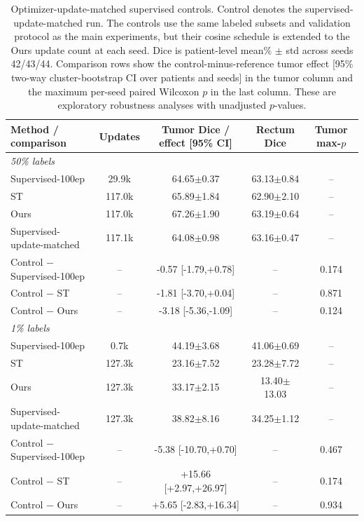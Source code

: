 \begin{table}[!htbp]
\centering
\caption{Optimizer-update-matched supervised controls. Control denotes the
supervised-update-matched run. The controls use the same labeled subsets and
validation protocol as the main experiments, but their cosine schedule is extended
to the Ours update count at each seed. Dice is patient-level mean\% $\pm$ std
across seeds 42/43/44. Comparison rows show the control-minus-reference tumor
effect [95\% two-way cluster-bootstrap CI over patients and seeds] in the tumor
column and the maximum per-seed paired Wilcoxon $p$ in the last column. These are
exploratory robustness analyses with unadjusted $p$-values.}
\label{tabS:update_matched}
\scriptsize
\setlength{\tabcolsep}{2.5pt}
\begin{tabular}{lcccc}
\toprule
Method / comparison & Updates & Tumor Dice / effect [95\% CI] & Rectum Dice & Tumor max-$p$ \\
\midrule
\multicolumn{5}{l}{\textit{50\% labels}} \\
Supervised-100ep & 29.9k & 64.65$\pm$0.37 & 63.13$\pm$0.84 & -- \\
ST & 117.0k & 65.89$\pm$1.84 & 62.90$\pm$2.10 & -- \\
Ours & 117.0k & 67.26$\pm$1.90 & 63.19$\pm$0.64 & -- \\
Supervised-update-matched & 117.1k & 64.08$\pm$0.98 & 63.16$\pm$0.47 & -- \\
\midrule
Control $-$ Supervised-100ep & -- & -0.57 [-1.79,+0.78] & -- & 0.174 \\
Control $-$ ST & -- & -1.81 [-3.70,+0.04] & -- & 0.871 \\
Control $-$ Ours & -- & -3.18 [-5.36,-1.09] & -- & 0.124 \\
\midrule
\multicolumn{5}{l}{\textit{1\% labels}} \\
Supervised-100ep & 0.7k & 44.19$\pm$3.68 & 41.06$\pm$0.69 & -- \\
ST & 127.3k & 23.16$\pm$7.52 & 23.28$\pm$7.72 & -- \\
Ours & 127.3k & 33.17$\pm$2.15 & 13.40$\pm$13.03 & -- \\
Supervised-update-matched & 127.3k & 38.82$\pm$8.16 & 34.25$\pm$1.12 & -- \\
\midrule
Control $-$ Supervised-100ep & -- & -5.38 [-10.70,+0.70] & -- & 0.467 \\
Control $-$ ST & -- & +15.66 [+2.97,+26.97] & -- & 0.174 \\
Control $-$ Ours & -- & +5.65 [-2.83,+16.34] & -- & 0.934 \\
\bottomrule
\end{tabular}
\end{table}
